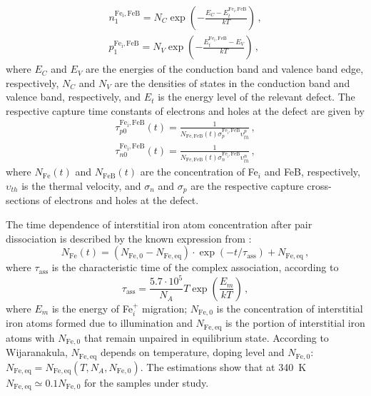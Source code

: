 \documentclass[%
 aip,jap,
 amsmath,amssymb,
 reprint,%
]{revtex4-1}
\begin{document}
\begin{eqnarray}
\label{eqp1n1}
n_1^\mathrm{Fe_i,FeB}=N_C \exp\left(-\frac{E_C-E_t^\mathrm{Fe_i,FeB}}{kT}\right)\,,\nonumber\\
p_1^\mathrm{Fe_i,FeB}=N_V \exp\left(-\frac{E_t^\mathrm{Fe_i,FeB}-E_V}{kT}\right)\,,
\end{eqnarray}
where 
$E_C$ and $E_V$ are the energies of the conduction band and valence band edge, respectively, 
$N_C$ and $N_V$ are the densities of states in the conduction band and valence band, respectively, and $E_t$ is the energy level of the relevant defect. 
The respective capture time constants of electrons and holes at the defect are given by
\begin{eqnarray}
\label{eqtaupn}
\tau_{p0}^\mathrm{Fe_i,FeB}(t)=\frac{1}{N_\mathrm{Fe,FeB}(t)\sigma_p^\mathrm{Fe_i,FeB}\upsilon_{th}^p}\,,\nonumber\\
\tau_{n0}^\mathrm{Fe_i,FeB}(t)=\frac{1}{N_\mathrm{Fe,FeB}(t)\sigma_n^\mathrm{Fe_i,FeB}\upsilon_{th}^n}\,,
\end{eqnarray}
where 
$N_\mathrm{Fe}(t)$ and $N_\mathrm{FeB}(t)$ are the concentration of Fe$_i$ and FeB, respectively, 
$\upsilon_{th}$ is the thermal velocity, 
and $\sigma_n$ and $\sigma_p$ are the respective capture cross-sections of electrons and holes at the defect.

The time dependence of interstitial iron atom concentration after pair dissociation is described by the known expression from \cite{MurphyJAP2011,FeB:kinetic}:
\begin{equation}
\label{eqNFet}
N_\mathrm{Fe}(t)=(N_\mathrm{Fe,0}-N_\mathrm{Fe,eq})\cdot
\exp(-t/\tau_\mathrm{ass})+N_\mathrm{Fe,eq}\,,
\end{equation}
where 
$\tau_\mathrm{ass}$ is the characteristic time of the complex association, 
according to \cite{FeBKin2019,FeBAssJAP2014,FeBAssSST2011}
\begin{equation}
\label{eqTass}
\tau_\mathrm{ass}=\frac{5.7\cdot10^5}{N_A}T\exp\left(\frac{E_m}{kT}\right)\,,
\end{equation}
where $E_m$ is the energy of Fe$_i^+$ migration; 
$N_\mathrm{Fe,0}$ is the concentration of interstitial iron atoms formed due to illumination and $N_\mathrm{Fe,eq}$ is the portion of  interstitial iron atoms with $N_\mathrm{Fe,0}$  that remain unpaired in equilibrium state. 
According to Wijaranakula\cite{FeB:kinetic}, 
$N_\mathrm{Fe,eq}$ depends on temperature, doping level and $N_\mathrm{Fe,0}$: 
$N_\mathrm{Fe,eq}= N_\mathrm{Fe,eq}(T, N_A, N_\mathrm{Fe,0})$. 
The estimations show that  at 340~K  $N_\mathrm{Fe,eq}\simeq0.1 N_\mathrm{Fe,0}$ 
for the samples under study.
\end{document}
